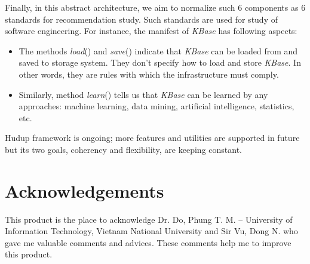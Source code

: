\documentclass[a4paper]{llncs}
\begin{document}
Finally, in this abstract architecture, we aim to normalize such 6 components as 6 standards for recommendation study. Such standards are used for study of software engineering. For instance, the manifest of \textit{KBase} has following aspects:
\begin{itemize}
\item The methods \textit{load}() and \textit{save}() indicate that \textit{KBase} can be loaded from and saved to storage system. They don't specify how to load and store \textit{KBase}. In other words, they are rules with which the infrastructure must comply.
\item Similarly, method \textit{learn}() tells us that \textit{KBase} can be learned by any approaches: machine learning, data mining, artificial intelligence, statistics, etc.
\end{itemize}
Hudup framework is ongoing; more features and utilities are supported in future but its two goals, coherency and flexibility, are keeping constant.

\section*{Acknowledgements}
\noindent This product is the place to acknowledge Dr. Do, Phung T. M. – University of Information Technology, Vietnam National University and Sir Vu, Dong N. who gave me valuable comments and advices. These comments help me to improve this product.


{\small
}
\end{document}
